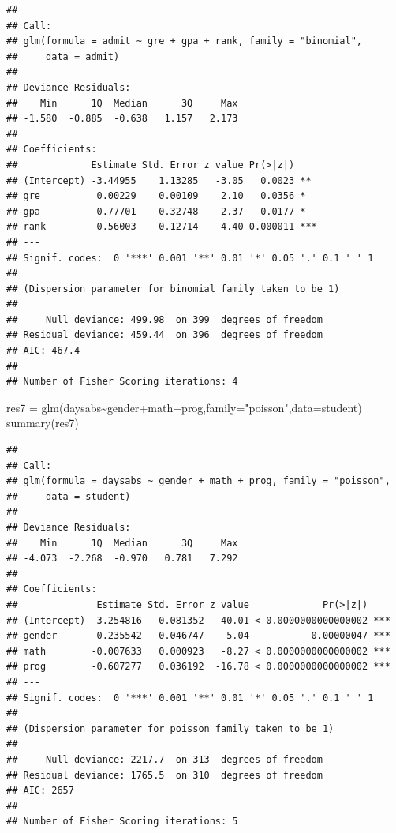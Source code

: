 \documentclass[
]{article}
\newenvironment{Shaded}{\begin{snugshade}}{\end{snugshade}}
\newcommand{\AttributeTok}[1]{\textcolor[rgb]{0.77,0.63,0.00}{#1}}
\newcommand{\FunctionTok}[1]{\textcolor[rgb]{0.00,0.00,0.00}{#1}}
\newcommand{\NormalTok}[1]{#1}
\newcommand{\OtherTok}[1]{\textcolor[rgb]{0.56,0.35,0.01}{#1}}
\newcommand{\SpecialCharTok}[1]{\textcolor[rgb]{0.00,0.00,0.00}{#1}}
\newcommand{\StringTok}[1]{\textcolor[rgb]{0.31,0.60,0.02}{#1}}
\begin{document}
\begin{verbatim}
## 
## Call:
## glm(formula = admit ~ gre + gpa + rank, family = "binomial", 
##     data = admit)
## 
## Deviance Residuals: 
##    Min      1Q  Median      3Q     Max  
## -1.580  -0.885  -0.638   1.157   2.173  
## 
## Coefficients:
##             Estimate Std. Error z value Pr(>|z|)    
## (Intercept) -3.44955    1.13285   -3.05   0.0023 ** 
## gre          0.00229    0.00109    2.10   0.0356 *  
## gpa          0.77701    0.32748    2.37   0.0177 *  
## rank        -0.56003    0.12714   -4.40 0.000011 ***
## ---
## Signif. codes:  0 '***' 0.001 '**' 0.01 '*' 0.05 '.' 0.1 ' ' 1
## 
## (Dispersion parameter for binomial family taken to be 1)
## 
##     Null deviance: 499.98  on 399  degrees of freedom
## Residual deviance: 459.44  on 396  degrees of freedom
## AIC: 467.4
## 
## Number of Fisher Scoring iterations: 4
\end{verbatim}

\begin{Shaded}
\begin{Highlighting}[]
\NormalTok{res7 }\OtherTok{=} \FunctionTok{glm}\NormalTok{(daysabs}\SpecialCharTok{\textasciitilde{}}\NormalTok{gender}\SpecialCharTok{+}\NormalTok{math}\SpecialCharTok{+}\NormalTok{prog,}\AttributeTok{family=}\StringTok{"poisson"}\NormalTok{,}\AttributeTok{data=}\NormalTok{student)}
\FunctionTok{summary}\NormalTok{(res7)}
\end{Highlighting}
\end{Shaded}

\begin{verbatim}
## 
## Call:
## glm(formula = daysabs ~ gender + math + prog, family = "poisson", 
##     data = student)
## 
## Deviance Residuals: 
##    Min      1Q  Median      3Q     Max  
## -4.073  -2.268  -0.970   0.781   7.292  
## 
## Coefficients:
##              Estimate Std. Error z value             Pr(>|z|)    
## (Intercept)  3.254816   0.081352   40.01 < 0.0000000000000002 ***
## gender       0.235542   0.046747    5.04           0.00000047 ***
## math        -0.007633   0.000923   -8.27 < 0.0000000000000002 ***
## prog        -0.607277   0.036192  -16.78 < 0.0000000000000002 ***
## ---
## Signif. codes:  0 '***' 0.001 '**' 0.01 '*' 0.05 '.' 0.1 ' ' 1
## 
## (Dispersion parameter for poisson family taken to be 1)
## 
##     Null deviance: 2217.7  on 313  degrees of freedom
## Residual deviance: 1765.5  on 310  degrees of freedom
## AIC: 2657
## 
## Number of Fisher Scoring iterations: 5
\end{verbatim}
\end{document}
